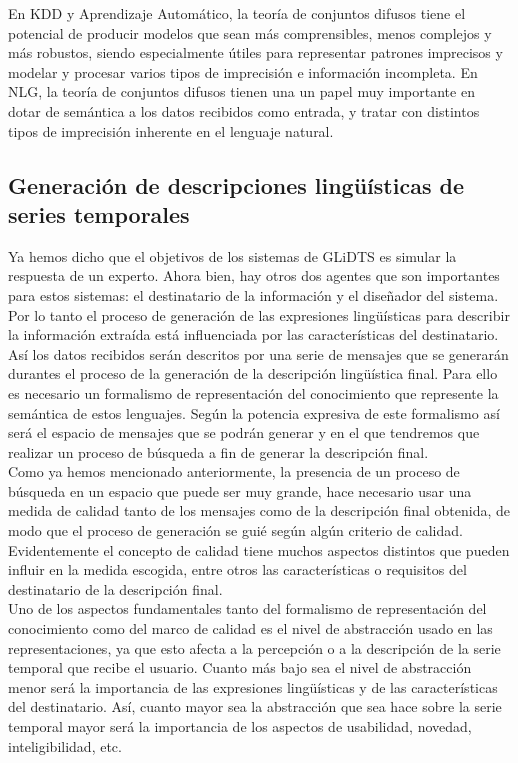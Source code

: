 \documentclass[10pt,a4paper]{article}
\begin{document}
En KDD y Aprendizaje Automático, la teoría de conjuntos difusos tiene el potencial de producir modelos que sean más comprensibles, menos complejos y más robustos, siendo especialmente útiles para representar patrones imprecisos y modelar y procesar varios tipos de imprecisión e información incompleta. En NLG, la teoría de conjuntos difusos tienen una un papel muy importante en dotar de semántica a los datos recibidos como entrada, y tratar con distintos tipos de imprecisión inherente en el lenguaje natural.

\subsection{Generación de descripciones lingüísticas de series temporales}

Ya hemos dicho que el objetivos de los sistemas de GLiDTS es simular la respuesta de un experto. Ahora bien, hay otros dos agentes que son importantes para estos sistemas: el destinatario de la información y el diseñador del sistema. Por lo tanto el proceso de generación de las expresiones lingüísticas para describir la información extraída está influenciada por las características del destinatario.\\

Así los datos recibidos serán descritos por una serie de mensajes que se generarán durantes el proceso de la generación de la descripción lingüística final. Para ello es necesario un formalismo de representación del conocimiento que represente la semántica de estos lenguajes. Según la potencia expresiva de este formalismo así será el espacio de mensajes que se podrán generar y en el que tendremos que realizar un proceso de búsqueda a fin de generar la descripción final.\\

Como ya hemos mencionado anteriormente, la presencia de un proceso de búsqueda en un espacio que puede ser muy grande, hace necesario usar una medida de calidad tanto de los mensajes como de la descripción final obtenida, de modo que el proceso de generación se guié según algún criterio de calidad. Evidentemente el concepto de calidad tiene muchos aspectos distintos que pueden influir en la medida escogida, entre otros las características o requisitos del destinatario de la descripción final.\\

Uno de los aspectos fundamentales tanto del formalismo de representación del conocimiento como del marco de calidad es el nivel de abstracción usado en las representaciones, ya que esto afecta a la percepción o a la descripción de la serie temporal que recibe el usuario. Cuanto más bajo sea el nivel de abstracción menor será la importancia de las expresiones lingüísticas y de las características del destinatario. Así, cuanto mayor sea la abstracción que sea hace sobre la serie temporal mayor será la importancia de los aspectos de usabilidad, novedad, inteligibilidad, etc.\\
\end{document}
